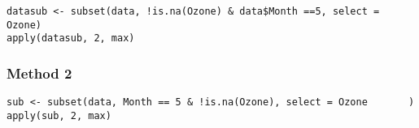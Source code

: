 \documentclass[]{article}
\begin{document}
\begin{verbatim}
datasub <- subset(data, !is.na(Ozone) & data$Month ==5, select = Ozone)
apply(datasub, 2, max)
\end{verbatim}

\hypertarget{method-2-6}{%
\subsubsection{Method 2}\label{method-2-6}}

\begin{verbatim}
sub <- subset(data, Month == 5 & !is.na(Ozone), select = Ozone       )
apply(sub, 2, max)
\end{verbatim}
\end{document}
